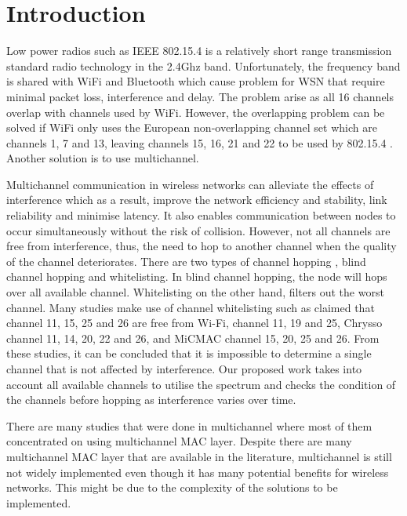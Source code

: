 \section{Introduction}

Low power radios such as IEEE 802.15.4 is a relatively short range transmission standard radio technology in the 2.4Ghz band. Unfortunately, the frequency band is shared with WiFi and Bluetooth which cause problem for WSN that require minimal packet loss, interference and delay. The problem arise as all 16 channels overlap with channels used by WiFi. However, the overlapping problem can be solved if WiFi only uses the European non-overlapping channel set which are channels 1, 7 and 13, leaving channels 15, 16, 21 and 22 to be used by 802.15.4 \cite{ieee_2012}. Another solution is to use multichannel.

Multichannel communication in wireless networks can alleviate the effects of interference which as a result, improve the network efficiency and stability, link reliability and minimise latency. It also enables communication between nodes to occur simultaneously without the risk of collision. However, not all channels are free from interference, thus, the need to hop to another channel when the quality of the channel deteriorates. There are two types of channel hopping \cite{watteyne}, blind channel hopping and whitelisting. In blind channel hopping, the node will hops over all available channel. Whitelisting on the other hand, filters out the worst channel. Many studies make use of channel whitelisting such as \cite{watteyne} claimed that channel 11, 15, 25 and 26 are free from Wi-Fi, \cite{wu} channel 11, 19 and 25, Chrysso \cite{chrysso} channel 11, 14, 20, 22 and 26, and MiCMAC \cite{micmac} channel 15, 20, 25 and 26. From these studies, it can be concluded that it is impossible to determine a single channel that is not affected by interference. Our proposed work takes into account all available channels to utilise the spectrum and checks the condition of the channels before hopping as interference varies over time.


There are many studies that were done in multichannel where most of them concentrated on using multichannel MAC layer. Despite there are many multichannel MAC layer that are available in the literature, multichannel is still not widely implemented even though it has many potential benefits for wireless networks. This might be due to the complexity of the solutions to be implemented. 

